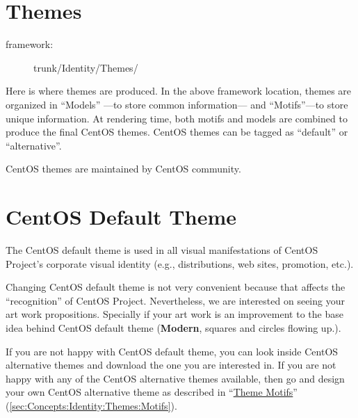\section{Themes}
\hypertarget{sec:Concepts:Identity:Themes}{}
\label{sec:Concepts:Identity:Themes}

\begin{description}
\item[framework:] trunk/Identity/Themes/
\end{description}

\noindent Here is where themes are produced.  In the above framework
location, themes are organized in ``Models'' ---to store common
information--- and ``Motifs''---to store unique information.  At
rendering time, both motifs and models are combined to produce the
final CentOS themes. CentOS themes can be tagged as ``default'' or
``alternative''. 

CentOS themes are maintained by CentOS community. 

\section{CentOS Default Theme}
\hypertarget{sec:Concepts:Identity:Themes:Default}{}
\label{sec:Concepts:Identity:Themes:Default}

The CentOS default theme is used in all visual manifestations of
CentOS Project's corporate visual identity (e.g., distributions, web
sites, promotion, etc.).

Changing CentOS default theme is not very convenient because that
affects the ``recognition'' of CentOS Project.  Nevertheless, we are
interested on seeing your art work propositions.  Specially if your
art work is an improvement to the base idea behind CentOS default theme
(\textbf{Modern}, squares and circles flowing up.).

If you are not happy with CentOS default theme, you can look inside
CentOS alternative themes and download the one you are interested in.
If you are not happy with any of the CentOS alternative themes
available, then go and design your own CentOS alternative theme as
described in ``\hyperlink{sec:Concepts:Identity:Themes:Motifs}{Theme
Motifs}'' (\autoref{sec:Concepts:Identity:Themes:Motifs}).

